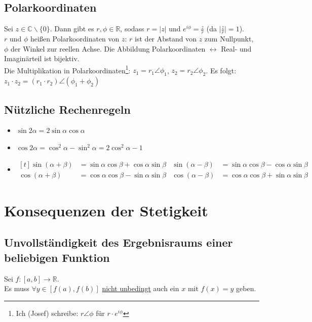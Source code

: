 \documentclass[halfparscip]{scrartcl}
\newcounter{subsection2}
\begin{document}
\subsection*{Polarkoordinaten}
Sei $z \in \mathbb{C} \backslash \{0\}$. Dann gibt es $r, \phi \in \mathbb{R}$, sodass $r = \vert z\vert$ und $e^{i\phi} = \frac{z}{r}$ (da $\vert\frac{z}{r}\vert = 1$).\\
$r$ und $\phi$ heißen Polarkoordinaten von $z$: $r$ ist der Abstand von $z$ zum Nullpunkt, $\phi$ der Winkel zur reellen Achse. Die Abbildung Polarkoordinaten $\leftrightarrow$ Real- und Imaginärteil ist bijektiv.\\
Die Multiplikation in Polarkoordinaten\footnote{Ich (Josef) schreibe: $r \angle \phi$ für $r \cdot e^{i\phi}$}: $z_1 = r_1 \angle \phi_1$, $z_2 = r_2 \angle \phi_2$. Es folgt: $z_1 \cdot z_2 = (r_1\cdot r_2) \angle (\phi_1 + \phi_2)$

\subsection*{Nützliche Rechenregeln}
\begin{itemize}
	\item $\sin 2\alpha = 2\sin \alpha \cos \alpha$
	\item $\cos 2 \alpha = \cos^2\alpha - \sin^2\alpha = 2\cos^2 \alpha - 1$
	\item $\begin{aligned}[t]
		\sin(\alpha + \beta) &= \sin \alpha \cos \beta + \cos\alpha\sin\beta & \sin(\alpha - \beta) &= \sin \alpha \cos \beta - \cos\alpha\sin\beta \\
		\cos(\alpha + \beta) &= \cos \alpha \cos \beta - \sin\alpha\sin\beta & \cos(\alpha - \beta) &= \cos \alpha \cos \beta + \sin\alpha\sin\beta
	\end{aligned}$
\end{itemize}

\newpage
\section{Konsequenzen der Stetigkeit}
\subsection{Unvollständigkeit des Ergebnisraums einer beliebigen Funktion}
Sei $f : [a,b] \rightarrow \mathbb{R}$.\\
Es muss $\forall y \in [f(a), f(b)]$ \underline{nicht unbedingt} auch ein $x$ mit $f(x) = y$ geben.
\end{document}
